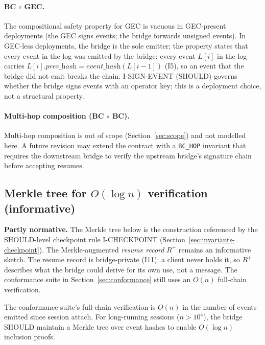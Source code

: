\paragraph{BC $\circ$ GEC.}
The compositional safety property for GEC is vacuous in
GEC-present deployments (the GEC signs events; the bridge forwards
unsigned events). In GEC-less deployments, the bridge is the sole
emitter; the property states that every event in the log was emitted
by the bridge: every event $L[i]$ in the log carries
$L[i].\textit{prev\_hash}=\textit{event\_hash}(L[i-1])$ (I5), so an
event that the bridge did not emit breaks the chain. I-SIGN-EVENT (SHOULD)
governs whether the bridge signs events with an operator key; this is
a deployment choice, not a structural property.

\paragraph{Multi-hop composition (BC $\circ$ BC).}
Multi-hop composition is out of scope (Section~\ref{sec:scope}) and
not modelled here. A future revision may extend the contract with a
\texttt{BC\_HOP} invariant that requires the downstream bridge to
verify the upstream bridge's signature chain before accepting
resumes.

\subsection{Merkle tree for $O(\log n)$ verification (informative)}
\label{app:merkle}

\textbf{Partly normative.} The Merkle tree below is the construction
referenced by the SHOULD-level checkpoint rule I-CHECKPOINT
(Section~\ref{sec:invariants-checkpoint}). The Merkle-augmented
\emph{resume record} $R^+$ remains an informative sketch. The
resume record is bridge-private (I11): a client never holds it, so $R^+$
describes what the bridge could derive for its own use, not a message. The conformance suite in Section~\ref{sec:conformance} still
uses an $O(n)$ full-chain verification.

The conformance suite's full-chain verification is
$O(n)$ in the number of events emitted since session attach. For
long-running sessions ($n > 10^4$), the bridge SHOULD maintain a
Merkle tree over event hashes to enable $O(\log n)$ inclusion proofs.

